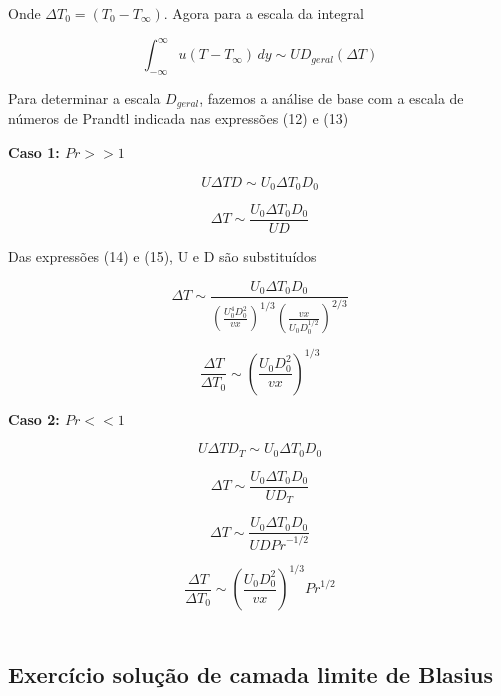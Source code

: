 \documentclass[12pt]{article}
\begin{document}
Onde $\Delta T_{0} = (T_{0} - T_\infty) $. Agora para a escala da integral

\begin{equation}
	\int_{-\infty}^{\infty} u (T - T_\infty) \, dy  \sim  U D_{geral} (\Delta T)
\end{equation}

Para determinar a escala $D_{geral}$, fazemos a análise de base com a escala de números de Prandtl indicada nas expressões (12) e (13)

\textbf{Caso 1: $Pr >> 1$}

\begin{equation}
	U \Delta T D \sim U_0 \Delta T_0 D_0
\end{equation}

\begin{equation}
	\Delta T \sim \frac{U_0 \Delta T_0 D_0}{U D}
\end{equation}

Das expressões (14) e (15), U e D são substituídos

\begin{equation}
	\Delta T \sim \frac{U_0 \Delta T_0 D_0}{\left( \frac{U_0^4 D_0^2}{v x} \right)^{1/3} \left( \frac{v x}{U_0 D_0^{1/2}} \right)^{2/3}}
\end{equation}

\begin{equation}
	\frac{\Delta T}{\Delta T_0} \sim \left( \frac{U_0 D_0^2}{v x} \right)^{1/3} 
\end{equation}

\textbf{Caso 2: $Pr << 1$}

\begin{equation}
	U \Delta T D_T \sim U_0 \Delta T_0 D_0
\end{equation}

\begin{equation}
	\Delta T \sim \frac{U_0 \Delta T_0 D_0}{U D_T}
\end{equation}

\begin{equation}
	\Delta T \sim \frac{U_0 \Delta T_0 D_0}{U D {Pr}^{-1/2}}
\end{equation}

\begin{equation}
	\frac{\Delta T}{\Delta T_0} \sim \left( \frac{U_0 D_0^2}{v x} \right)^{1/3}  {Pr}^{1/2}
\end{equation}
\\


\subsection*{Exercício solução de camada limite de Blasius}
\end{document}

